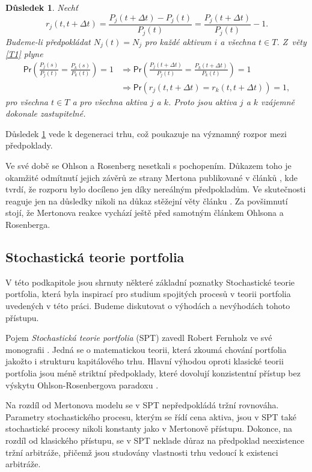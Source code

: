 \documentclass[a4paper,12pt]{report}
\newtheorem{dusledek}[veta]{Důsledek}
\theoremstyle{definition} \newtheorem{definice}[veta]{Definice}
\theoremstyle{remark}
\begin{document}
\begin{dusledek}\label{OR_dusledek}
Nechť 
$$r_j(t,t+\Delta t)=\frac{P_j(t+\Delta t)-P_j(t)}{P_j(t)}=\frac{P_j(t+\Delta t)}{P_j(t)}-1.$$
Budeme-li předpokládat $N_j(t)=N_j$ pro každé aktivum $i$ a všechna $t\in T$. 
Z~věty \ref{T1} plyne
\begin{align*}
\mathsf{Pr}\left(\frac{P_j(s)}{P_j(t)}=\frac{P_k(s)}{P_k(t)}\right)=1&\Longrightarrow\mathsf{Pr}\left(\frac{P_j(t+\Delta t)}{P_j(t)}=\frac{P_k(t+\Delta t)}{P_k(t)}\right)=1 \\
&\Longrightarrow\mathsf{Pr}\left(r_j(t,t+\Delta t)=r_k(t,t+\Delta t)\right)=1,
\end{align*}
pro všechna $t\in T$ a pro všechna aktiva $j$ a $k$.
Proto jsou aktiva $j$ a $k$ vzájemně dokonale zastupitelné.
\end{dusledek}
Důsledek \ref{OR_dusledek} vede k degeneraci trhu, což poukazuje na významný rozpor mezi předpoklady.

Ve své době se Ohlson a Rosenberg nesetkali s pochopením.
Důkazem toho je okamžité odmítnutí jejich závěrů ze strany Mertona publikované v článků \cite{merton1975}, kde tvrdí, že rozporu bylo docíleno jen díky nereálným předpokladům. 
Ve skutečnosti reaguje jen na důsledky nikoli na důkaz stěžejní věty článku \cite{ohlson}.  
Za povšimnutí stojí, že Mertonova reakce vychází ještě před samotným článkem Ohlsona a Rosenberga.


\subsection{Stochastická teorie portfolia}
V této podkapitole jsou shrnuty některé základní poznatky Stochastické teorie portfolia, která byla inspirací pro studium spojitých procesů v teorii portfolia uvedených v této práci.
Budeme diskutovat o výhodách a nevýhodách tohoto přístupu.

Pojem \textit{Stochastická teorie portfolia} (SPT) zavedl Robert Fernholz ve své monografii \cite{fern}.
Jedná se o matematickou teorii, která zkoumá chování portfolia jakožto i strukturu kapitálového trhu.
Hlavní výhodou oproti klasické teorii portfolia jsou méně  striktní předpoklady, které dovolují konzistentní přístup bez výskytu Ohlson-Rosenbergova paradoxu \cite{ohlson}.

Na rozdíl od Mertonova modelu se v SPT nepředpokládá tržní rovnováha.
Parametry stochastického procesu, kterým se řídí cena aktiva, jsou v SPT také stochastické procesy nikoli konstanty jako v Mertonově přístupu.
Dokonce, na rozdíl od klasického přístupu, se v SPT neklade důraz na předpoklad neexistence tržní arbitráže, přičemž jsou studovány vlastnosti trhu vedoucí k existenci arbitráže. 
\end{document}
